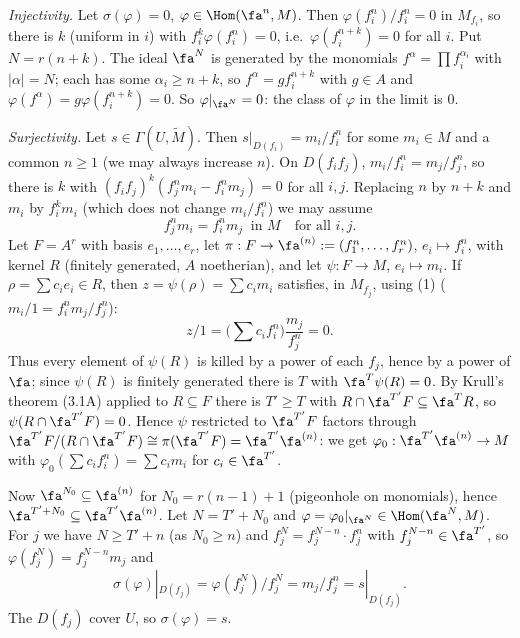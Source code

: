 \documentclass[11pt]{article}
\begin{document}
\emph{Injectivity.} Let $\sigma(\varphi)=0$, $\varphi\in\Hom(\fa^n,M)$. Then $\varphi(f_i^n)/f_i^n=0$ in $M_{f_i}$, so there is $k$ (uniform in $i$) with $f_i^k\varphi(f_i^n)=0$, i.e.\ $\varphi(f_i^{n+k})=0$ for all $i$. Put $N=r(n+k)$. The ideal $\fa^N$ is generated by the monomials $f^\alpha=\prod f_i^{\alpha_i}$ with $|\alpha|=N$; each has some $\alpha_i\ge n+k$, so $f^\alpha=gf_i^{n+k}$ with $g\in A$ and $\varphi(f^\alpha)=g\varphi(f_i^{n+k})=0$. So $\varphi|_{\fa^N}=0$: the class of $\varphi$ in the limit is $0$.

\emph{Surjectivity.} Let $s\in\Gamma(U,\widetilde M)$. Then $s|_{D(f_i)}=m_i/f_i^{n}$ for some $m_i\in M$ and a common $n\ge1$ (we may always increase $n$). On $D(f_if_j)$, $m_i/f_i^n=m_j/f_j^n$, so there is $k$ with $(f_if_j)^k(f_j^nm_i-f_i^nm_j)=0$ for all $i,j$. Replacing $n$ by $n+k$ and $m_i$ by $f_i^km_i$ (which does not change $m_i/f_i^n$) we may assume
\[
f_j^nm_i=f_i^nm_j\ \text{ in }M\quad\text{for all }i,j.\tag{1}
\]
Let $F=A^r$ with basis $e_1,\dots,e_r$, let $\pi:F\to\fa^{(n)}:=(f_1^n,\dots,f_r^n)$, $e_i\mapsto f_i^n$, with kernel $R$ (finitely generated, $A$ noetherian), and let $\psi:F\to M$, $e_i\mapsto m_i$. If $\rho=\sum c_ie_i\in R$, then $z=\psi(\rho)=\sum c_im_i$ satisfies, in $M_{f_j}$, using (1) ($m_i/1=f_i^nm_j/f_j^n$):
\[
z/1=\Big(\sum c_if_i^n\Big)\frac{m_j}{f_j^n}=0 .
\]
Thus every element of $\psi(R)$ is killed by a power of each $f_j$, hence by a power of $\fa$; since $\psi(R)$ is finitely generated there is $T$ with $\fa^T\psi(R)=0$. By Krull's theorem (3.1A) applied to $R\subseteq F$ there is $T'\ge T$ with $R\cap\fa^{T'}F\subseteq\fa^TR$, so $\psi(R\cap\fa^{T'}F)=0$. Hence $\psi$ restricted to $\fa^{T'}F$ factors through $\fa^{T'}F/(R\cap\fa^{T'}F)\cong\pi(\fa^{T'}F)=\fa^{T'}\fa^{(n)}$: we get $\varphi_0:\fa^{T'}\fa^{(n)}\to M$ with $\varphi_0(\sum c_if_i^n)=\sum c_im_i$ for $c_i\in\fa^{T'}$.

Now $\fa^{N_0}\subseteq\fa^{(n)}$ for $N_0=r(n-1)+1$ (pigeonhole on monomials), hence $\fa^{T'+N_0}\subseteq\fa^{T'}\fa^{(n)}$. Let $N=T'+N_0$ and $\varphi=\varphi_0|_{\fa^N}\in\Hom(\fa^N,M)$. For $j$ we have $N\ge T'+n$ (as $N_0\ge n$) and $f_j^N=f_j^{N-n}\cdot f_j^n$ with $f_j^{N-n}\in\fa^{T'}$, so $\varphi(f_j^N)=f_j^{N-n}m_j$ and
\[
\sigma(\varphi)|_{D(f_j)}=\varphi(f_j^N)/f_j^N=m_j/f_j^n=s|_{D(f_j)}.
\]
The $D(f_j)$ cover $U$, so $\sigma(\varphi)=s$.
\end{document}
